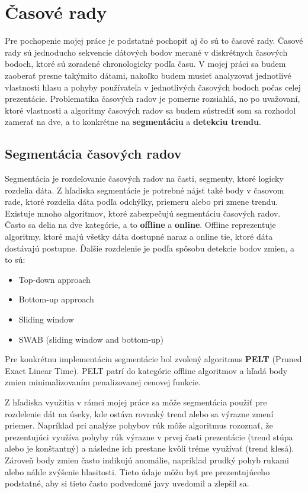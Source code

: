 \section{Časové rady}
Pre pochopenie mojej práce je podstatné pochopiť aj čo sú to časové rady. Časové rady sú jednoducho sekvencie dátových bodov merané v diskrétnych časových bodoch, ktoré sú zoradené chronologicky podľa času\cite{timeSeriesDef}. V mojej práci sa budem zaoberať presne takýmito dátami, nakoľko budem musieť analyzovať jednotlivé vlastnosti hlasu a pohyby používateľa v jednotlivých časových bodoch počas celej prezentácie. Problematika časových radov je pomerne rozsiahlá, no po uvažovaní, ktoré vlastnosti a algoritmy časových radov sa budem sústrediť som sa rozhodol zamerať na dve, a to konkrétne na \textbf{segmentáciu} a \textbf{detekciu trendu}.

\subsection{Segmentácia časových radov}
\label{sec:segmentacia}
Segmentácia je rozdeľovanie časových radov na časti, segmenty, ktoré logicky rozdelia dáta\cite{timeSeriesSeg}. Z hľadiska segmentácie je potrebné nájsť také body v časovom rade, ktoré rozdelia dáta podľa odchýlky, priemeru alebo pri zmene trendu. Existuje mnoho algoritmov, ktoré zabezpečujú segmentáciu časových radov. Často sa delia na dve kategórie, a to \textbf{offline} a \textbf{online}\cite{timeSeriesSeg}. Offline reprezentuje algoritmy, ktoré majú všetky dáta dostupné naraz a online tie, ktoré dáta dostávajú postupne. Ďalšie rozdelenie je podľa spôsobu detekcie bodov zmien, a to sú:
\begin{itemize}
    \item Top-down approach
    \item Bottom-up approach
    \item Sliding window
    \item SWAB (sliding window and bottom-up)
\end{itemize}

Pre konkrétnu implementáciu segmentácie bol zvolený algoritmus \textbf{PELT} (Pruned Exact Linear Time)\cite{peltAlgorithm}. PELT patrí do kategórie offline algoritmov a hľadá body zmien minimalizovaním penalizovanej cenovej funkcie.

Z hľadiska využitia v rámci mojej práce sa môže segmentácia použiť pre rozdelenie dát na úseky, kde ostáva rovnaký trend alebo sa výrazne zmení priemer. Napríklad pri analýze pohybov rúk môže algoritmus rozoznať, že prezentujúci využíva pohyby rúk výrazne v prvej časti prezentácie (trend stúpa alebo je konštantný) a následne ich prestane kvôli tréme využívať (trend klesá). Zároveň body zmien často indikujú anomálie, napríklad prudký pohyb rukami alebo náhle zvýšenie hlasitosti. Tieto údaje môžu byť pre prezentujúceho podstatné, aby si tieto často podvedomé javy uvedomil a zlepšil sa.

